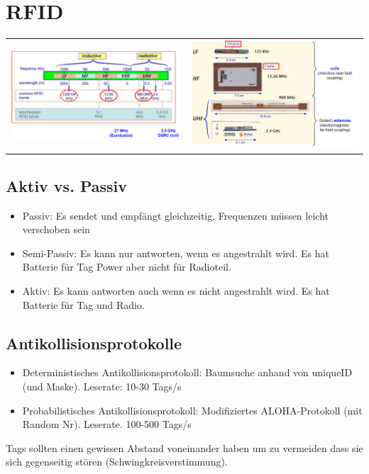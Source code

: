 
\section{RFID}
\begin{tabular}[h]{c c}

\parbox{6cm}{
    \includegraphics[width=8cm]{./bilder/RFIDFrequenzen.png} } 
&

\parbox{6cm}{
    \includegraphics[width=8cm]{./bilder/RFIDTags.png} } \\
\end{tabular}
\subsection{Aktiv vs. Passiv}
	\begin{itemize}
		\item Passiv: Es sendet und empfängt gleichzeitig, Frequenzen müssen leicht verschoben sein
		\item Semi-Passiv: Es kann nur antworten, wenn es angestrahlt wird. Es hat Batterie für Tag Power aber nicht für Radioteil. 
		\item Aktiv: Es kann antworten auch wenn es nicht angestrahlt wird. Es hat Batterie für Tag und Radio. 
	\end{itemize}
\subsection{Antikollisionsprotokolle}
	\begin{itemize}
		 \item Deterministisches Antikollisionsprotokoll: Baumsuche anhand von uniqueID (und Maske). Leserate: 10-30 Tags/s
		 \item Probabilistisches Antikollisionsprotokoll: Modifiziertes ALOHA-Protokoll (mit Random Nr). Leserate. 100-500 Tags/s
	\end{itemize}
	Tags sollten einen gewissen Abstand voneinander haben um zu vermeiden dass sie sich gegenseitig stören (Schwingkreisverstimmung).

